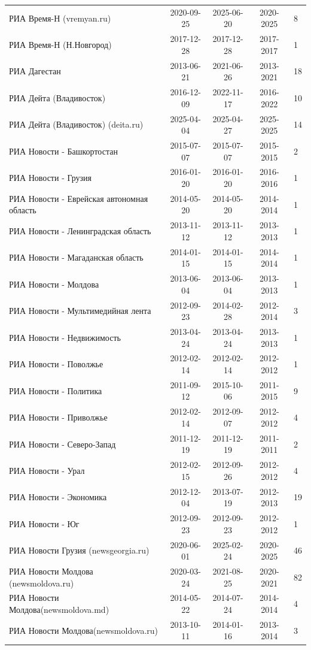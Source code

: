 \begin{longtable}{p{6cm}cccp{2cm}}
РИА Время-Н (vremyan.ru) & 2020-09-25 & 2025-06-20 & 2020-2025 & 8\\
РИА Время-Н (Н.Новгород) & 2017-12-28 & 2017-12-28 & 2017-2017 & 1\\
РИА Дагестан & 2013-06-21 & 2021-06-26 & 2013-2021 & 18\\
РИА Дейта (Владивосток) & 2016-12-09 & 2022-11-17 & 2016-2022 & 10\\
РИА Дейта (Владивосток) (deita.ru) & 2025-04-04 & 2025-04-27 & 2025-2025 & 14\\
РИА Новости - Башкортостан & 2015-07-07 & 2015-07-07 & 2015-2015 & 2\\
РИА Новости - Грузия & 2016-01-20 & 2016-01-20 & 2016-2016 & 1\\
РИА Новости - Еврейская автономная область & 2014-05-20 & 2014-05-20 & 2014-2014 & 1\\
РИА Новости - Ленинградская область & 2013-11-12 & 2013-11-12 & 2013-2013 & 1\\
РИА Новости - Магаданская область & 2014-01-15 & 2014-01-15 & 2014-2014 & 1\\
РИА Новости - Молдова & 2013-06-04 & 2013-06-04 & 2013-2013 & 1\\
РИА Новости - Мультимедийная лента & 2012-09-23 & 2014-02-28 & 2012-2014 & 3\\
РИА Новости - Недвижимость & 2013-04-24 & 2013-04-24 & 2013-2013 & 1\\
РИА Новости - Поволжье & 2012-02-14 & 2012-02-14 & 2012-2012 & 1\\
РИА Новости - Политика & 2011-09-12 & 2015-10-06 & 2011-2015 & 9\\
РИА Новости - Приволжье & 2012-02-14 & 2012-09-07 & 2012-2012 & 4\\
РИА Новости - Северо-Запад & 2011-12-19 & 2011-12-19 & 2011-2011 & 2\\
РИА Новости - Урал & 2012-02-15 & 2012-09-26 & 2012-2012 & 4\\
РИА Новости - Экономика & 2012-12-04 & 2013-07-19 & 2012-2013 & 19\\
РИА Новости - Юг & 2012-09-23 & 2012-09-23 & 2012-2012 & 1\\
РИА Новости Грузия (newsgeorgia.ru) & 2020-06-01 & 2025-02-24 & 2020-2025 & 46\\
РИА Новости Молдова (newsmoldova.ru) & 2020-03-24 & 2021-08-25 & 2020-2021 & 82\\
РИА Новости Молдова(newsmoldova.md) & 2014-05-22 & 2014-07-24 & 2014-2014 & 4\\
РИА Новости Молдова(newsmoldova.ru) & 2013-10-11 & 2014-01-16 & 2013-2014 & 3\\

\end{longtable}
